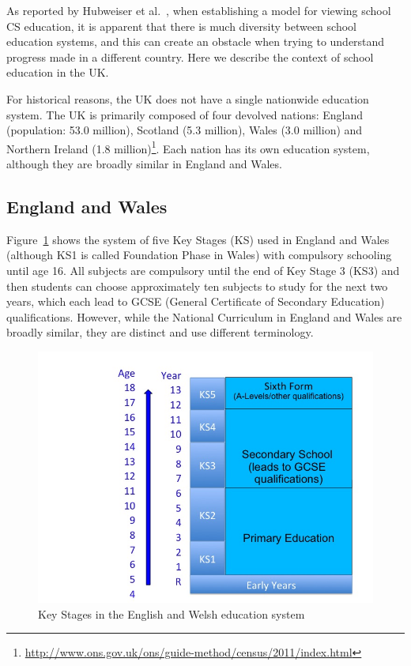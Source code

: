 \documentclass{sig-alternate}
\begin{document}
As reported by Hubweiser et al.~\cite{hubwieser-et-al:2011}, when establishing a
model for viewing school CS education, it is apparent that there is
much diversity between school education systems, and this can create
an obstacle when trying to understand progress made in a different
country. Here we describe the context of school education in the UK.

For historical reasons, the UK does not have a single nationwide
education system.  The UK is primarily composed of four devolved
nations: England (population: 53.0 million), Scotland (5.3 million),
Wales (3.0 million) and Northern Ireland (1.8
million)\footnote{\url{http://www.ons.gov.uk/ons/guide-method/census/2011/index.html}}.
Each nation has its own education system, although they are broadly
similar in England and Wales.

\subsection{England and Wales}
Figure~\ref{fig:key-stages} shows the system of five Key Stages (KS)
used in England and Wales (although KS1 is called Foundation Phase in
Wales) with compulsory schooling until age 16. All subjects are
compulsory until the end of Key Stage 3 (KS3) and then students can
choose approximately ten subjects to study for the next two years,
which each lead to GCSE (General Certificate of Secondary Education)
qualifications. However, while the National Curriculum in England and
Wales are broadly similar, they are distinct and use different
terminology.

\begin{figure}
  \centering
  \includegraphics[width=\columnwidth]{images/key-stages.png}
  \caption{Key Stages in the English and Welsh education system}
  \label{fig:key-stages}
\end{figure}
\end{document}
